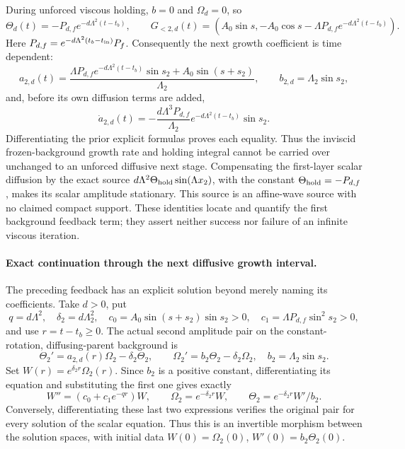 \documentclass[11pt]{article}
\begin{document}
During unforced viscous holding, $b=0$ and $\Omega_d=0$, so
\[
 \Theta_d(t)=-P_{d,f}e^{-d\Lambda^2(t-t_b)},\qquad
 G_{<2,d}(t)=(A_0\sin s,
 -A_0\cos s-\Lambda P_{d,f}e^{-d\Lambda^2(t-t_b)}).
\]
Here $P_{d,f}=e^{-d\Lambda^2(t_b-t_{\rm in})}P_f$.
Consequently the next growth coefficient is time dependent:
\[
 a_{2,d}(t)=\frac{\Lambda P_{d,f}e^{-d\Lambda^2(t-t_b)}\sin s_2
                    +A_0\sin(s+s_2)}{\Lambda _2},\qquad
 b_{2,d}=\Lambda _2\sin s_2,
\]
and, before its own diffusion terms are added,
\[
 \dot a_{2,d}(t)=
 -\frac{d\Lambda^3P_{d,f}}{\Lambda _2}
 e^{-d\Lambda^2(t-t_b)}\sin s_2.
\]
Differentiating the prior explicit formulas proves each equality.
Thus the inviscid frozen-background growth rate and holding integral
cannot be carried over unchanged to an unforced diffusive next stage.
Compensating the first-layer scalar diffusion by the exact source
$d\Lambda^2\Theta_{\rm hold}\sin(\Lambda x_2)$, with the constant
$\Theta_{\rm hold}=-P_{d,f}$, makes its scalar amplitude stationary.
This source is an affine-wave source with no
claimed compact support. These identities locate and quantify the
first background feedback term; they assert neither success nor
failure of an infinite viscous iteration.

\paragraph{Exact continuation through the next diffusive growth interval.}
The preceding feedback has an explicit solution beyond merely naming
its coefficients. Take $d>0$, put
\[
 q=d\Lambda^2,\quad \delta_2=d\Lambda _2^2,\quad
 c_0=A_0\sin(s+s_2)\sin s_2>0,\quad
 c_1=\Lambda P_{d,f}\sin^2s_2>0,
\]
and use $r=t-t_b\geq0$. The actual second amplitude pair on the
constant-rotation, diffusing-parent background is
\[
 \Theta_2'=a_{2,d}(r)\Omega_2-\delta_2\Theta_2,\qquad
 \Omega_2'=b_2\Theta_2-\delta_2\Omega_2,
 \quad b_2=\Lambda _2\sin s_2.
\]
Set $W(r)=e^{\delta_2r}\Omega_2(r)$. Since $b_2$ is a positive
constant, differentiating its equation and substituting the first one
gives exactly
\begin{equation}\label{eq:feedbackscalar}
 W''=(c_0+c_1e^{-qr})W,\qquad
 \Omega_2=e^{-\delta_2r}W,\qquad
 \Theta_2=e^{-\delta_2r}W'/b_2.
\end{equation}
Conversely, differentiating these last two expressions verifies the
original pair for every solution of the scalar equation. Thus this is
an invertible morphism between the solution spaces, with initial data
$W(0)=\Omega_2(0)$, $W'(0)=b_2\Theta_2(0)$.
\end{document}
